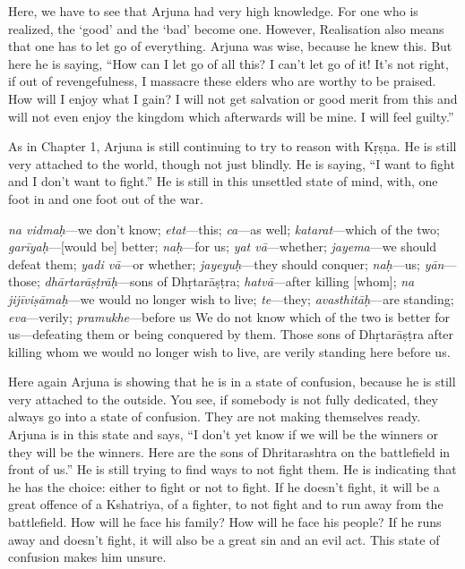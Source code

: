 Here, we have to see that Arjuna had very high knowledge. For one who is realized, the ‘good’ and the ‘bad’ become one. However, Realisation also means that one has to let go of everything. Arjuna was wise, because he knew this. But here he is saying, “How can I let go of all this? I can’t let go of it! It’s not right, if out of revengefulness, I massacre these elders who are worthy to be praised. How will I enjoy what I gain? I will not get salvation or good merit from this and will not even enjoy the kingdom which afterwards will be mine. I will feel guilty.”

As in Chapter 1, Arjuna is still continuing to try to reason with Kṛṣṇa. He is still very attached to the world, though not just blindly. He is saying, “I want to fight and I don’t want to fight.” He is still in this unsettled state of mind, with, one foot in and one foot out of the war.

{%
  \textit{na vidmaḥ}---we don't know; 
  \textit{etat}---this; 
  \textit{ca}---as well; 
  \textit{katarat}---which of the two; 
  \textit{garīyaḥ}---[would be] better; 
  \textit{naḥ}---for us; 
  \textit{yat vā}---whether; 
  \textit{jayema}---we should defeat them; 
  \textit{yadi vā}---or whether; 
  \textit{jayeyuḥ}---they should conquer; 
  \textit{naḥ}---us; 
  \textit{yān}---those; 
  \textit{dhārtarāṣṭrāḥ}---sons of Dhṛtarāṣṭra; 
  \textit{hatvā}---after killing [whom]; 
  \textit{na jijīviṣāmaḥ}---we would no longer wish to live; 
  \textit{te}---they; 
  \textit{avasthitāḥ}---are standing; 
  \textit{eva}---verily; 
  \textit{pramukhe}---before us
}
{%
  We do not know which of the two is better for us—defeating them or being conquered by them. Those sons of Dhṛtarāṣṭra after killing whom we would no longer wish to live, are verily standing here before us.
}

Here again Arjuna is showing that he is in a state of confusion, because he is still very attached to the outside. You see, if somebody is not fully dedicated, they always go into a state of confusion. They are not making themselves ready. Arjuna is in this state and says, “I don’t yet know if we will be the winners or they will be the winners. Here are the sons of Dhritarashtra on the battlefield in front of us.” He is still trying to find ways to not fight them. He is indicating that he has the choice: either to fight or not to fight. If he doesn’t fight, it will be a great offence of a Kshatriya, of a fighter, to not fight and to run away from the battlefield. How will he face his family? How will he face his people? If he runs away and doesn’t fight, it will also be a great sin and an evil act. This state of confusion makes him unsure.

